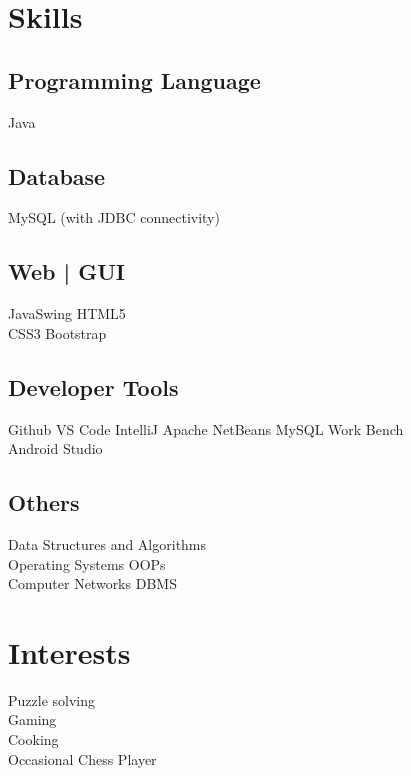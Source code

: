 \documentclass[]{deedy-resume-openfont}
\begin{document}
\begin{minipage}[t]{0.33\textwidth}

\section{Skills}
\subsection{Programming Language}
\textbullet{} Java  \\ 
\sectionsep

\subsection{Database}
\textbullet{} MySQL (with JDBC connectivity)\\ 
\sectionsep

\subsection{Web | GUI}
\textbullet{} JavaSwing \textbullet{} HTML5 \\ \textbullet{} CSS3 \textbullet{} Bootstrap \\
\sectionsep

\subsection{Developer Tools}
\textbullet{} Github \textbullet{} VS Code \textbullet{} IntelliJ \textbullet{} Apache NetBeans \textbullet{} MySQL Work Bench \\ \textbullet{} Android Studio
\sectionsep

\subsection{Others}
\textbullet{} Data Structures and Algorithms \\ \textbullet{} Operating Systems
\textbullet{} OOPs \\
\textbullet{} Computer Networks \textbullet{} DBMS 
\sectionsep

\section{Interests}
\textbullet{} Puzzle solving  \\ 
\textbullet{} Gaming  \\ 
\textbullet{} Cooking \\
\textbullet{} Occasional Chess Player \\
\sectionsep


\end{minipage}
\end{document}
